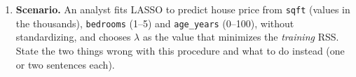\documentclass[
  11pt,
]{article}
\providecommand{\tightlist}{%
  \setlength{\itemsep}{0pt}\setlength{\parskip}{0pt}}
\newcommand{\answerspace}[1]{\par\vspace*{#1}}  %
\newcommand{\answerpage}{\clearpage}
\begin{document}
\answerspace{2in}
\answerpage

\begin{enumerate}
\def\labelenumi{(\alph{enumi})}
\setcounter{enumi}{3}
\tightlist
\item
  \textbf{Scenario.} An analyst fits LASSO to predict house price from
  \texttt{sqft} (values in the thousands), \texttt{bedrooms} (1--5) and
  \texttt{age\_years} (0--100), without standardizing, and chooses
  \(\lambda\) as the value that minimizes the \emph{training} RSS. State
  the two things wrong with this procedure and what to do instead (one
  or two sentences each).
\end{enumerate}

\answerspace{2in}
\end{document}
